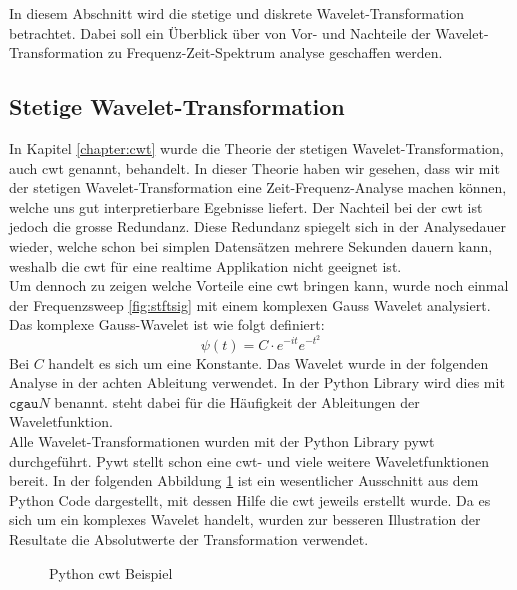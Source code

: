 
In diesem Abschnitt wird die stetige und diskrete Wavelet-Transformation betrachtet. Dabei soll ein Überblick über von Vor- und Nachteile der Wavelet-Transformation zu Frequenz-Zeit-Spektrum analyse geschaffen werden. 



\subsection{Stetige Wavelet-Transformation} 
In Kapitel \ref{chapter:cwt} wurde die Theorie der stetigen Wavelet-Transformation, auch cwt genannt, behandelt. In dieser Theorie haben wir gesehen, dass wir mit der stetigen Wavelet-Transformation eine Zeit-Frequenz-Analyse machen können, welche uns gut interpretierbare Egebnisse liefert. Der Nachteil bei der cwt ist jedoch die grosse Redundanz. Diese Redundanz spiegelt sich in der Analysedauer wieder, welche schon bei simplen Datensätzen mehrere Sekunden dauern kann, weshalb die cwt für eine realtime Applikation nicht geeignet ist.\\
Um dennoch zu zeigen welche Vorteile eine cwt bringen kann, wurde noch einmal der Frequenzsweep \ref{fig:stftsig} mit einem komplexen Gauss Wavelet analysiert. Das komplexe Gauss-Wavelet ist wie folgt definiert:
\begin{equation}
\psi(t)=C \cdot e^{-it} e^{-t^{2}}
\label{eq:cgau}
\end{equation}
Bei $C$ handelt es sich um eine Konstante. Das Wavelet wurde in der folgenden Analyse in der achten Ableitung verwendet. In der Python Library wird dies mit $\texttt{cgau}N$ benannt.  steht dabei für die Häufigkeit der Ableitungen der Waveletfunktion.\\

Alle Wavelet-Transformationen wurden mit der Python Library pywt \cite{Lee2019PyWavelets} durchgeführt. Pywt stellt schon eine cwt- und viele weitere Waveletfunktionen bereit. In der folgenden Abbildung \ref{fig:python-cwt} ist ein wesentlicher Ausschnitt aus dem Python Code dargestellt, mit dessen Hilfe die cwt jeweils erstellt wurde. Da es sich um ein komplexes Wavelet handelt, wurden zur besseren Illustration der Resultate die Absolutwerte der Transformation verwendet.\\

\begin{figure}[!ht]
	\centering
	
	\caption{Python cwt Beispiel}
	\label{fig:python-cwt}
\end{figure}

